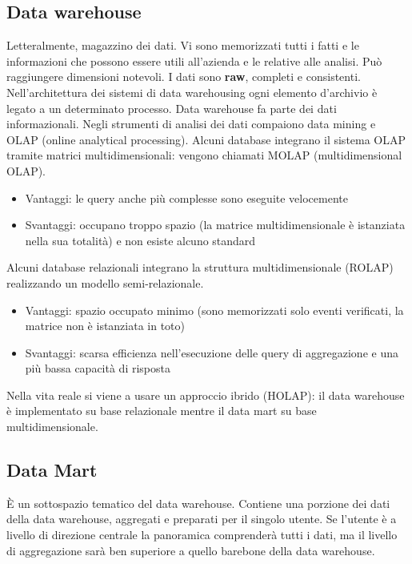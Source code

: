 \subsection{Data warehouse}\label{data-warehouse}

Letteralmente, magazzino dei dati. Vi sono memorizzati tutti i fatti e
le informazioni che possono essere utili all'azienda e le relative alle analisi.
Pu\`o raggiungere dimensioni notevoli. I dati sono \textbf{raw}, completi e consistenti.\\
Nell'architettura dei sistemi di data warehousing ogni elemento
d'archivio \`e legato a un determinato processo. Data warehouse fa parte
dei dati informazionali. Negli strumenti di analisi dei dati compaiono
data mining e OLAP (online analytical processing). Alcuni database integrano il sistema OLAP tramite matrici multidimensionali: vengono chiamati MOLAP (multidimensional OLAP).

\begin{itemize}

\item
  Vantaggi: le query anche pi\`u complesse sono eseguite velocemente
\item
  Svantaggi: occupano troppo spazio (la matrice multidimensionale \`e
  istanziata nella sua totalit\`a) e non esiste alcuno standard
\end{itemize}

Alcuni database relazionali integrano la struttura multidimensionale (ROLAP)
realizzando un modello semi-relazionale.

\begin{itemize}

\item
  Vantaggi: spazio occupato minimo (sono memorizzati solo eventi
  verificati, la matrice non \`e istanziata in toto)
\item
  Svantaggi: scarsa efficienza nell'esecuzione delle query di
  aggregazione e una pi\`u bassa capacit\`a di risposta
\end{itemize}

Nella vita reale si viene a usare un approccio ibrido (HOLAP): il data
warehouse \`e implementato su base relazionale mentre il data mart su base
multidimensionale.

\subsection{Data Mart}\label{data-mart}

\`E un sottospazio tematico del data warehouse.
Contiene una porzione dei dati della data warehouse, aggregati e
preparati per il singolo utente. Se l'utente \`e a livello di direzione
centrale la panoramica comprender\`a tutti i dati, ma il livello di
aggregazione sar\`a ben superiore a quello barebone della data warehouse.

